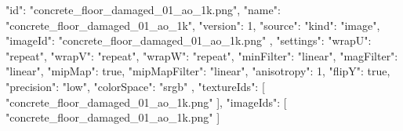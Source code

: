 {
  "id": "concrete_floor_damaged_01_ao_1k.png",
  "name": "concrete_floor_damaged_01_ao_1k",
  "version": 1,
  "source": {
    "kind": "image",
    "imageId": "concrete_floor_damaged_01_ao_1k.png"
  },
  "settings": {
    "wrapU": "repeat",
    "wrapV": "repeat",
    "wrapW": "repeat",
    "minFilter": "linear",
    "magFilter": "linear",
    "mipMap": true,
    "mipMapFilter": "linear",
    "anisotropy": 1,
    "flipY": true,
    "precision": "low",
    "colorSpace": "srgb"
  },
  "textureIds": [
    "concrete_floor_damaged_01_ao_1k.png"
  ],
  "imageIds": [
    "concrete_floor_damaged_01_ao_1k.png"
  ]
}
